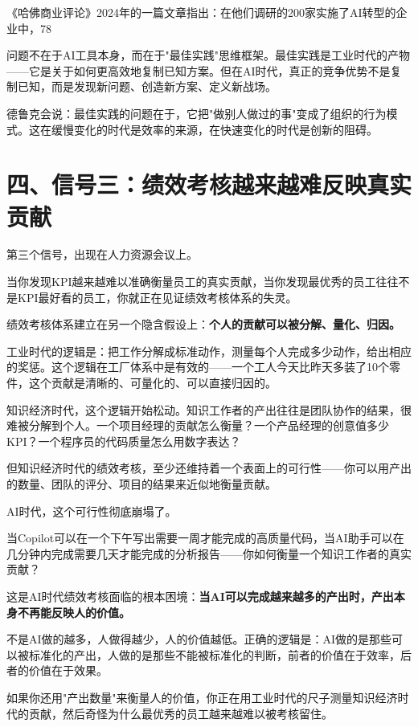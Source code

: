 《哈佛商业评论》2024年的一篇文章指出：在他们调研的200家实施了AI转型的企业中，78%

问题不在于AI工具本身，而在于"最佳实践"思维框架。最佳实践是工业时代的产物——它是关于如何更高效地复制已知方案。但在AI时代，真正的竞争优势不是复制已知，而是发现新问题、创造新方案、定义新战场。

德鲁克会说：最佳实践的问题在于，它把"做别人做过的事"变成了组织的行为模式。这在缓慢变化的时代是效率的来源，在快速变化的时代是创新的阻碍。


\section{四、信号三：绩效考核越来越难反映真实贡献}


第三个信号，出现在人力资源会议上。

当你发现KPI越来越难以准确衡量员工的真实贡献，当你发现最优秀的员工往往不是KPI最好看的员工，你就正在见证绩效考核体系的失灵。

绩效考核体系建立在另一个隐含假设上：\textbf{个人的贡献可以被分解、量化、归因。}

工业时代的逻辑是：把工作分解成标准动作，测量每个人完成多少动作，给出相应的奖惩。这个逻辑在工厂体系中是有效的——一个工人今天比昨天多装了10个零件，这个贡献是清晰的、可量化的、可以直接归因的。

知识经济时代，这个逻辑开始松动。知识工作者的产出往往是团队协作的结果，很难被分解到个人。一个项目经理的贡献怎么衡量？一个产品经理的创意值多少KPI？一个程序员的代码质量怎么用数字表达？

但知识经济时代的绩效考核，至少还维持着一个表面上的可行性——你可以用产出的数量、团队的评分、项目的结果来近似地衡量贡献。

AI时代，这个可行性彻底崩塌了。

当Copilot可以在一个下午写出需要一周才能完成的高质量代码，当AI助手可以在几分钟内完成需要几天才能完成的分析报告——你如何衡量一个知识工作者的真实贡献？

这是AI时代绩效考核面临的根本困境：\textbf{当AI可以完成越来越多的产出时，产出本身不再能反映人的价值。}

不是AI做的越多，人做得越少，人的价值越低。正确的逻辑是：AI做的是那些可以被标准化的产出，人做的是那些不能被标准化的判断，前者的价值在于效率，后者的价值在于效果。

如果你还用"产出数量"来衡量人的价值，你正在用工业时代的尺子测量知识经济时代的贡献，然后奇怪为什么最优秀的员工越来越难以被考核留住。

